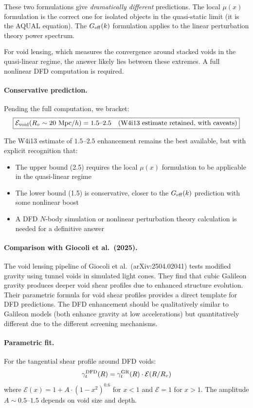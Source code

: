 \documentclass[11pt,a4paper]{article}
\newcommand{\Geff}{G_{\rm eff}}
\begin{document}
These two formulations give \emph{dramatically different} predictions.
The local $\mu(x)$ formulation is the correct one for isolated objects
in the quasi-static limit (it is the AQUAL equation).  The $\Geff(k)$
formulation applies to the linear perturbation theory power spectrum.

For void lensing, which measures the convergence around stacked voids
in the quasi-linear regime, the answer likely lies between these extremes.
A full nonlinear DFD computation is required.

\paragraph{Conservative prediction.}
Pending the full computation, we bracket:
\begin{equation}
\boxed{
\mathcal{E}_{\rm void}(R_v \sim 20~\text{Mpc}/h)
= 1.5 \text{--} 2.5 \quad (\text{W4i13 estimate retained, with caveats})
}
\end{equation}

The W4i13 estimate of $1.5$--$2.5$ enhancement remains the best available,
but with explicit recognition that:
\begin{itemize}
\item The upper bound (2.5) requires the local $\mu(x)$ formulation
  to be applicable in the quasi-linear regime
\item The lower bound (1.5) is conservative, closer to the $\Geff(k)$
  prediction with some nonlinear boost
\item A DFD $N$-body simulation or nonlinear perturbation theory
  calculation is needed for a definitive answer
\end{itemize}

\paragraph{Comparison with Giocoli et al.\ (2025).}
The void lensing pipeline of Giocoli et al.\ (arXiv:2504.02041) tests
modified gravity using tunnel voids in simulated light cones.  They
find that cubic Galileon gravity produces deeper void shear profiles
due to enhanced structure evolution.  Their parametric formula for
void shear profiles provides a direct template for DFD predictions.
The DFD enhancement should be qualitatively similar to Galileon models
(both enhance gravity at low accelerations) but quantitatively different
due to the different screening mechanisms.

\paragraph{Parametric fit.}
For the tangential shear profile around DFD voids:
\begin{equation}
\gamma_t^{\rm DFD}(R) = \gamma_t^{\rm GR}(R) \cdot \mathcal{E}(R/R_v)
\end{equation}
where $\mathcal{E}(x) = 1 + A \cdot (1 - x^2)^{0.6}$ for $x < 1$
and $\mathcal{E} = 1$ for $x > 1$.  The amplitude $A \sim 0.5$--$1.5$
depends on void size and depth.
\end{document}
